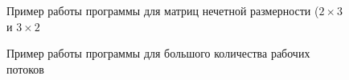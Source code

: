 \documentclass[a4paper,12pt]{article}
\begin{document}
            \begin{figure}[h!]
                \caption{Пример работы программы для матриц нечетной размерности ($2 \times 3$ и $3 \times 2$}
                \label{fig:image_test_3}
            \end{figure}
            
               \begin{figure}[h!]
                \caption{Пример работы программы для большого количества рабочих потоков}
                \label{fig:image_test_4}
            \end{figure}
    \newpage
	\mbox{}
	\newpage
\end{document}
